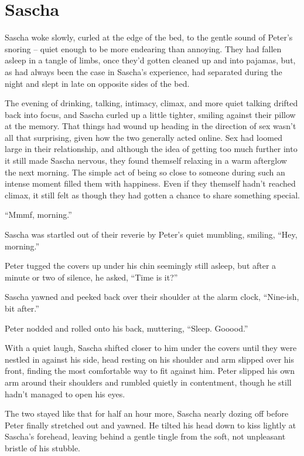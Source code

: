 \chapter{Sascha}

Sascha woke slowly, curled at the edge of the bed, to the gentle sound of Peter's snoring -- quiet enough to be more endearing than annoying. They had fallen asleep in a tangle of limbs, once they'd gotten cleaned up and into pajamas, but, as had always been the case in Sascha's experience, had separated during the night and slept in late on opposite sides of the bed.

The evening of drinking, talking, intimacy, climax, and more quiet talking drifted back into focus, and Sascha curled up a little tighter, smiling against their pillow at the memory. That things had wound up heading in the direction of sex wasn't all that surprising, given how the two generally acted online. Sex had loomed large in their relationship, and although the idea of getting too much further into it still made Sascha nervous, they found themself relaxing in a warm afterglow the next morning. The simple act of being so close to someone during such an intense moment filled them with happiness. Even if they themself hadn't reached climax, it still felt as though they had gotten a chance to share something special.

``Mmmf, morning.''

Sascha was startled out of their reverie by Peter's quiet mumbling, smiling, ``Hey, morning.''

Peter tugged the covers up under his chin seemingly still asleep, but after a minute or two of silence, he asked, ``Time is it?''

Sascha yawned and peeked back over their shoulder at the alarm clock, ``Nine-ish, bit after.''

Peter nodded and rolled onto his back, muttering, ``Sleep. Gooood.''

With a quiet laugh, Sascha shifted closer to him under the covers until they were nestled in against his side, head resting on his shoulder and arm slipped over his front, finding the most comfortable way to fit against him. Peter slipped his own arm around their shoulders and rumbled quietly in contentment, though he still hadn't managed to open his eyes.

The two stayed like that for half an hour more, Sascha nearly dozing off before Peter finally stretched out and yawned. He tilted his head down to kiss lightly at Sascha's forehead, leaving behind a gentle tingle from the soft, not unpleasant bristle of his stubble.

